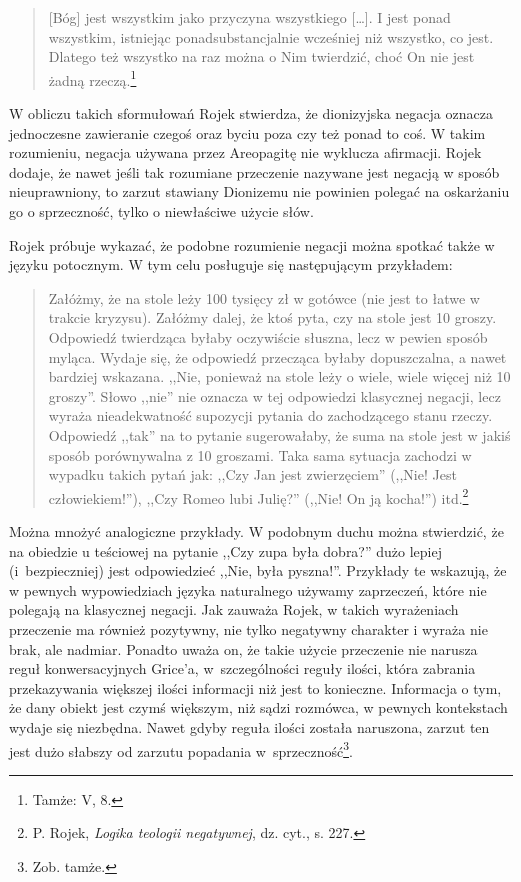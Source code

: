 \begin{quote}
    [Bóg] jest wszystkim jako przyczyna wszystkiego […]. I jest ponad
wszystkim, istniejąc ponadsubstancjalnie wcześniej niż wszystko, co
jest. Dlatego też wszystko na raz można o Nim twierdzić, choć On nie
jest żadną rzeczą.\footnote{Tamże: V, 8. }
\end{quote}





W obliczu takich sformułowań Rojek stwierdza, że dionizyjska negacja
oznacza jednoczesne zawieranie czegoś oraz byciu poza czy też ponad to
coś. W takim rozumieniu, negacja używana przez Areopagitę nie wyklucza
afirmacji. Rojek dodaje, że nawet jeśli tak rozumiane przeczenie nazywane jest negacją w sposób nieuprawniony,
to zarzut stawiany Dionizemu nie powinien
polegać na oskarżaniu go o sprzeczność, tylko o niewłaściwe użycie
słów.

Rojek próbuje wykazać, że podobne rozumienie negacji można spotkać także
w języku potocznym. W tym celu posługuje się następującym przykładem:

\begin{quote}
    Załóżmy, że na stole leży 100 tysięcy zł w gotówce (nie jest to łatwe w
trakcie kryzysu). Załóżmy dalej, że ktoś pyta, czy na stole jest 10
groszy. Odpowiedź twierdząca byłaby oczywiście słuszna, lecz w pewien
sposób myląca. Wydaje się, że odpowiedź przecząca byłaby dopuszczalna,
a nawet bardziej wskazana. ,,Nie, ponieważ na stole leży o wiele, wiele
więcej niż 10 groszy''. Słowo ,,nie'' nie oznacza w tej odpowiedzi
klasycznej negacji, lecz wyraża nieadekwatność supozycji pytania do
zachodzącego stanu rzeczy. Odpowiedź ,,tak'' na to pytanie sugerowałaby,
że suma na stole jest w jakiś sposób porównywalna z 10 groszami. Taka
sama sytuacja zachodzi w wypadku takich pytań jak: ,,Czy Jan jest
zwierzęciem'' (,,Nie! Jest człowiekiem!''), ,,Czy Romeo lubi Julię?'' (,,Nie!
On ją kocha!'') itd.\footnote{P. Rojek, \textit{Logika teologii negatywnej}, dz. cyt., s. 227. }
\end{quote}






Można mnożyć analogiczne przykłady. W podobnym duchu można stwierdzić,
że na obiedzie u teściowej na pytanie ,,Czy zupa była dobra?'' dużo
lepiej (i~bezpieczniej) jest odpowiedzieć ,,Nie, była pyszna!''.
Przykłady te wskazują, że w pewnych wypowiedziach  języka naturalnego
używamy zaprzeczeń, które nie polegają na klasycznej negacji. Jak
zauważa Rojek, w takich wyrażeniach przeczenie ma również pozytywny, nie tylko negatywny
charakter i wyraża nie brak, ale nadmiar. Ponadto uważa on, że takie
użycie przeczenie nie narusza reguł konwersacyjnych Grice'a, w~szczególności reguły ilości, która zabrania przekazywania większej
ilości informacji niż jest to konieczne. Informacja o tym, że dany
obiekt jest czymś większym, niż sądzi rozmówca, w pewnych kontekstach
wydaje się niezbędna. Nawet gdyby reguła ilości została naruszona,
zarzut ten jest dużo słabszy od zarzutu popadania w~sprzeczność\footnote{Zob. tamże.}.

